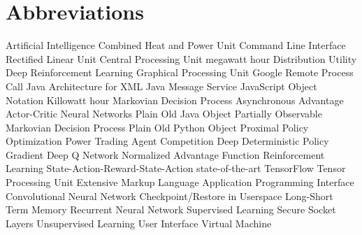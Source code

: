 \newpage
\section*{Abbreviations}
\begin        {acronym}[PowerTAC]
	       {Artificial Intelligence}
	      {Combined Heat and Power Unit}
	      {Command Line Interface}
         {Rectified Linear Unit}
	      {Central Processing Unit}
          {megawatt hour}
	       {Distribution Utility}
	   {Deep Reinforcement Learning}
	      {Graphical Processing Unit}
	     {Google Remote Process Call}
	     {Java Architecture for XML}
	      {Java Message Service}
	     {JavaScript Object Notation}
          {Killowatt hour}
	      {Markovian Decision Process}
          {Asynchronous Advantage Actor-Critic}
	       {Neural Networks}
	     {Plain Old Java Object}
	    {Partially Observable Markovian Decision Process}
	     {Plain Old Python Object}
	      {Proximal Policy Optimization}
	 {Power Trading Agent Competition}
         {Deep Deterministic Policy Gradient}
          {Deep Q Network}
          {Normalized Advantage Function}
	       {Reinforcement Learning}
	    {State-Action-Reward-State-Action}
	     {state-of-the-art}
	       {TensorFlow}
	      {Tensor Processing Unit}
	      {Extensive Markup Language}
          {Application Programming Interface}
          {Convolutional Neural Network}
         {Checkpoint/Restore in Userspace}
         {Long-Short Term Memory}
          {Recurrent Neural Network}
           {Supervised Learning}
           {Secure Socket Layers}
           {Unsupervised Learning}
           {User Interface}
           {Virtual Machine}

\end          {acronym}
